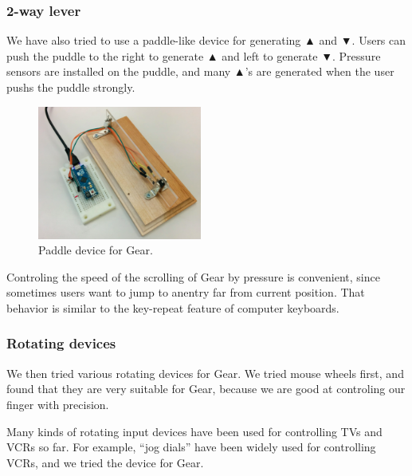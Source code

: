 \documentclass[conference]{IEEEtran}
\def\up{▲}
\def\down{▼}
\begin{document}
%


\subsubsection{2-way lever}

We have also tried to use a paddle-like device for generating {\up} and {\down}.
Users can push the puddle to the right to generate {\up} and
left to generate {\down}.
Pressure sensors are installed on the puddle, and
many {\up}'s are generated when the user pushs the puddle strongly.

\begin{figure}[H]
  \centerline{\includegraphics[width=54mm,bb=0 0 514 418]{figures/3c2de63899653056f3c6be835b9aaf43.png}}
\caption{Paddle device for Gear.}
\label{paddle}
\end{figure}

Controling the speed of the scrolling of Gear by pressure is convenient,
since sometimes users want to jump to anentry far from current position.
That behavior is similar to the key-repeat feature of computer keyboards.


\subsubsection{Rotating devices}

We then tried various rotating devices for Gear.
%
We tried mouse wheels first, and found that they are very suitable for Gear,
because we are good at controling our finger with precision.

Many kinds of rotating input devices have been used for controlling TVs and VCRs so far.
For example, ``jog dials'' have been widely used for controlling VCRs, and we tried the device for Gear.
\end{document}
